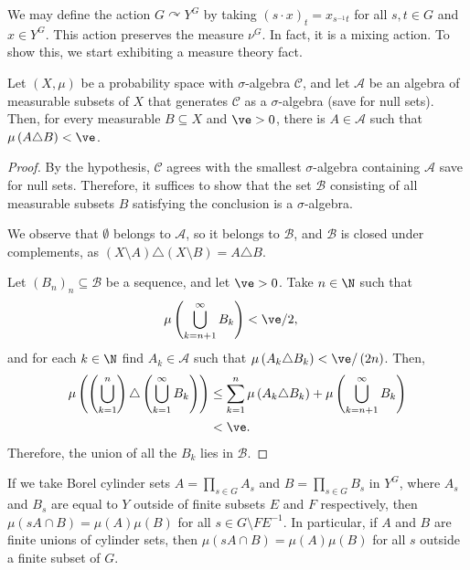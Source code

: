 \documentclass[10pt]{mypackage}
\begin{document}
We may define the action $G\curvearrowright Y^G$ by taking $\left( s\cdot x \right)_t = x_{s^{-1}t}$ for all $s,t\in G$ and $x\in Y^{G}$. This action preserves the measure $\nu^{G}$. In fact, it is a mixing action. To show this, we start exhibiting a measure theory fact.
\begin{proposition}
  Let $\left( X,\mu \right)$ be a probability space with $\sigma$-algebra $\mathcal{C}$, and let $\mathcal{A}$ be an algebra of measurable subsets of $X$ that generates $\mathcal{C}$ as a $\sigma$-algebra (save for null sets). Then, for every measurable $B\subseteq X$ and $\ve > 0$, there is $A\in \mathcal{A}$ such that $\mu\left( A\triangle B \right) < \ve$.
\end{proposition}
\begin{proof}
  By the hypothesis, $\mathcal{C}$ agrees with the smallest $\sigma$-algebra containing $\mathcal{A}$ save for null sets. Therefore, it suffices to show that the set $\mathcal{B}$ consisting of all measurable subsets $B$ satisfying the conclusion is a $\sigma$-algebra.

  We observe that $\emptyset$ belongs to $\mathcal{A}$, so it belongs to $\mathcal{B}$, and $\mathcal{B}$ is closed under complements, as $\left( X\setminus A \right)\triangle \left( X\setminus B \right) = A\triangle B$.

  Let $\left( B_n \right)_n\subseteq \mathcal{B}$ be a sequence, and let $\ve > 0$. Take $n\in \N$ such that
  \begin{align*}
    \mu\left( \bigcup_{k=n+1}^{\infty}B_k \right) &< \ve/2,
  \end{align*}
  and for each $k\in \N$ find $A_k\in \mathcal{A}$ such that $\mu\left( A_k\triangle B_k \right) < \ve/\left( 2n \right)$. Then,
  \begin{align*}
    \mu\left( \left( \bigcup_{k=1}^{n} \right)\triangle \left( \bigcup_{k=1}^{\infty}B_k \right) \right) &\leq \sum_{k=1}^{n}\mu\left( A_k\triangle B_k \right) + \mu\left( \bigcup_{k=n+1}^{\infty}B_k \right)\\
                                                                                                         &< \ve.
  \end{align*}
  Therefore, the union of all the $B_k$ lies in $\mathcal{B}$.
\end{proof}
If we take Borel cylinder sets $A = \prod_{s\in G}A_s$ and $B = \prod_{s\in G}B_s$ in $Y^G$, where $A_s$ and $B_s$ are equal to $Y$ outside of finite subsets $E$ and $F$ respectively, then $\mu\left( sA\cap B \right) = \mu\left( A \right)\mu\left( B \right)$ for all $s\in G\setminus FE^{-1}$. In particular, if $A$ and $B$ are finite unions of cylinder sets, then $\mu\left( sA\cap B \right) = \mu\left( A \right)\mu\left( B \right)$ for all $s$ outside a finite subset of $G$.
\end{document}
